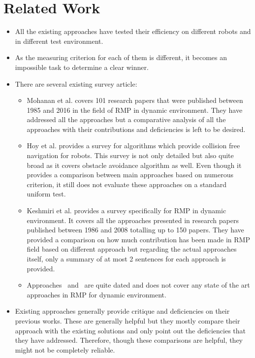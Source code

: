 \documentclass[rnd]{mas_proposal}
\begin{document}
\chapter{Related Work}
\begin{itemize}
    \item All the existing approaches have tested their efficiency on different robots and in different test environment.
    \item As the measuring criterion for each of them is different, it becomes an impossible task to determine a clear winner.
    \item There are several existing survey article:
        \begin{itemize}
            \item Mohanan et al.\cite{mohanan2018a} covers 101 research papers that were published between 1985 and 2016 in the field of RMP in dynamic environment. 
                They have addressed all the approaches but a comparative analysis of all the approaches with their contributions and deficiencies is left to be desired.
            \item Hoy et al.\cite{hoy2015algorithms} provides a survey for algorithms which provide collision free navigation for robots. 
                This survey is not only detailed but also quite broad as it covers obstacle avoidance algorithm as well. 
                Even though it provides a comparison between main approaches based on numerous criterion, it still does not evaluate these approaches on a standard uniform test.
            \item Keshmiri et al.\cite{keshmiri2009overview} provides a survey specifically for RMP in dynamic environment. 
                It covers all the approaches presented in research papers published between 1986 and 2008 totalling up to 150 papers. 
                They have provided a comparison on how much contribution has been made in RMP field based on different approach but regarding the actual approaches itself, only a summary of at most 2 sentences for each approach is provided.
            \item Approaches~\cite{fujimura1991motion} and~\cite{tsubouchi1996motion} are quite dated and does not cover any state of the art approaches in RMP for dynamic environment.
        \end{itemize}
    \item Existing approaches generally provide critique and deficiencies on their previous works. These are generally helpful but they mostly compare their approach with the existing solutions and only point out the deficiencies that they have addressed. Therefore, though these comparisons are helpful, they might not be completely reliable.
\end{itemize}
\end{document}
